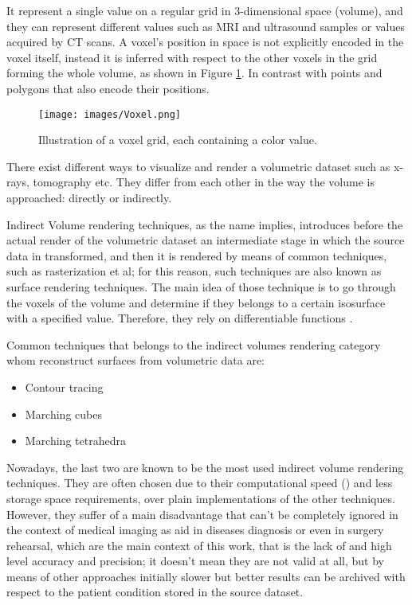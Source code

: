 \documentclass[12pt,a4paper]{extarticle}
\newcommand{\linespace}{\vspace{8pt}}
\begin{document}
It represent a single value on a regular grid in 3-dimensional space (volume), and they can represent different values such as MRI and ultrasound samples or values acquired by CT scans. A voxel's position in space is not explicitly encoded in the voxel itself, instead it is inferred with respect to the other voxels in the grid forming the whole volume, as shown in Figure \ref{fig:voxel}. In contrast with points and polygons that also encode their positions. %

\begin{figure}[hbtp]
\centering
\texttt{[image: images/Voxel.png]}
\caption{Illustration of a voxel grid, each containing a color value.}
\label{fig:voxel}
\end{figure}

There exist different ways to visualize and render a volumetric dataset such as x-rays, tomography etc. They differ from each other in the way the volume is approached: directly or indirectly.
\linespace

Indirect Volume rendering techniques, as the name implies, introduces before the actual render of the volumetric dataset an intermediate stage in which the source data in transformed, and then it is rendered by means of common techniques, such as rasterization et al; for this reason, such techniques are also known as surface rendering techniques.
The main idea of those technique is to go through the voxels of the volume and determine if they belongs to a certain isosurface with a specified value. Therefore, they rely on differentiable functions \cite{levoy_1988:4}.


Common techniques that belongs to the indirect volumes rendering category whom reconstruct surfaces from volumetric data are:
\begin{itemize}
\item Contour tracing
\item Marching cubes
\item Marching tetrahedra
\end{itemize}

Nowadays, the last two are known to be the most used indirect volume rendering techniques.
They are often chosen due to their computational speed (\cite{volume_vis_5:1})
and less storage space requirements, over plain implementations of the other techniques. However, they suffer of a main disadvantage that can't be completely ignored in the context of medical imaging as aid in diseases diagnosis or even in surgery rehearsal, which are the main context of this work, that is the lack of and high level accuracy and precision; it doesn't mean they are not valid at all, but by means of other approaches initially slower but better results can be archived with respect to the patient condition stored in the source dataset.  
\end{document}
